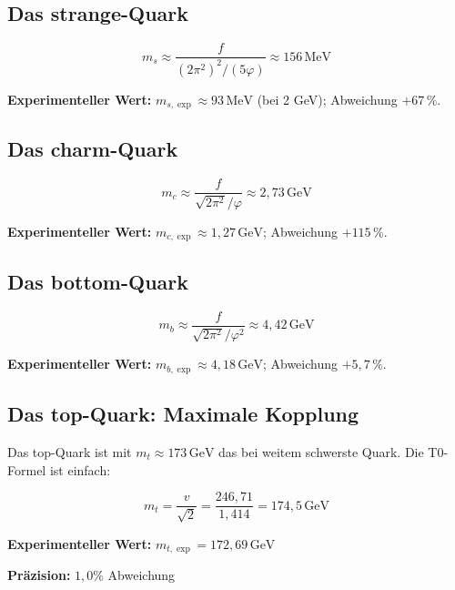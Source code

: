 	\subsection{Das strange-Quark}
	
	\begin{equation}
		\boxed{m_s \approx \frac{f}{(2\pi^2)^2/(5\varphi)} \approx 156\,\text{MeV}}
	\end{equation}
	
	\textbf{Experimenteller Wert:} \(m_{s,\exp} \approx 93\,\text{MeV}\) (bei 2 GeV); Abweichung $+67\,\%$.
	
	\subsection{Das charm-Quark}
	
	\begin{equation}
		\boxed{m_c \approx \frac{f}{\sqrt{2\pi^2}/\varphi} \approx 2{,}73\,\text{GeV}}
	\end{equation}
	
	\textbf{Experimenteller Wert:} \(m_{c,\exp} \approx 1{,}27\,\text{GeV}\); Abweichung $+115\,\%$.
	
	\subsection{Das bottom-Quark}
	
	\begin{equation}
		\boxed{m_b \approx \frac{f}{\sqrt{2\pi^2}/\varphi^2} \approx 4{,}42\,\text{GeV}}
	\end{equation}
	
	\textbf{Experimenteller Wert:} \(m_{b,\exp} \approx 4{,}18\,\text{GeV}\); Abweichung $+5{,}7\,\%$.
	
	\subsection{Das top-Quark: Maximale Kopplung}
	
	Das top-Quark ist mit \(m_t \approx 173\,\text{GeV}\) das bei weitem schwerste Quark. Die T0-Formel ist einfach:
	
	\begin{equation}
		\boxed{m_t = \frac{v}{\sqrt{2}} = \frac{246{,}71}{1{,}414} = 174{,}5\,\text{GeV}}
	\end{equation}
	
	\textbf{Experimenteller Wert:} \(m_{t,\exp} = 172{,}69\,\text{GeV}\)
	
	\textbf{Präzision:} \(1{,}0\%\) Abweichung
	
